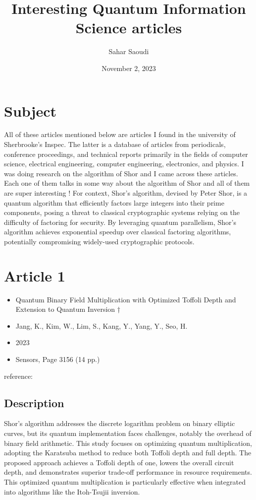\documentclass{article}
\title{Interesting Quantum Information Science articles}
\author{Sahar Saoudi}
\date{November 2, 2023}
\begin{document}
\maketitle


\section{Subject}
All of these articles mentioned below are articles I found in the university of Sherbrooke's Inspec. The latter is a database of articles from periodicals, conference proceedings, and technical reports primarily in the fields of computer science, electrical engineering, computer engineering, electronics, and physics.
I was doing research on the algorithm of Shor and I came across these articles. Each one of them talks in some way about the algorithm of Shor and all of them are super interesting !
For context, Shor's algorithm, devised by Peter Shor, is a quantum algorithm that efficiently factors large integers into their prime components, posing a threat to classical cryptographic systems relying on the difficulty of factoring for security. By leveraging quantum parallelism, Shor's algorithm achieves exponential speedup over classical factoring algorithms, potentially compromising widely-used cryptographic protocols. 

\section{Article 1}\label{sec:section1}
\begin{itemize}
    \item Quantum Binary Field Multiplication with Optimized Toffoli Depth and Extension to Quantum Inversion †
    \item Jang, K., Kim, W., Lim, S., Kang, Y., Yang, Y., Seo, H.
    \item 2023
    \item Sensors, Page 3156 (14 pp.)
\end{itemize}
reference: \cite{23442639}

\subsection{Description}\label{subsec:subsec1}
Shor's algorithm addresses the discrete logarithm problem on binary elliptic curves, but its quantum implementation faces challenges, notably the overhead of binary field arithmetic. This study focuses on optimizing quantum multiplication, adopting the Karatsuba method to reduce both Toffoli depth and full depth. The proposed approach achieves a Toffoli depth of one, lowers the overall circuit depth, and demonstrates superior trade-off performance in resource requirements. This optimized quantum multiplication is particularly effective when integrated into algorithms like the Itoh-Tsujii inversion. 
\end{document}
